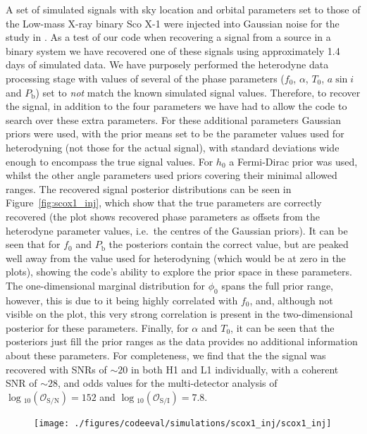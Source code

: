 A set of simulated signals with sky location and orbital parameters set to those of the Low-mass X-ray binary Sco X-1 were injected into
Gaussian noise for the study in \citet{2015PhRvD..92b3006M}. As a test of our code when recovering a signal from a source in a binary system
we have recovered one of these signals using approximately 1.4 days of simulated data. We have purposely performed the heterodyne data processing stage
with values of several of the phase parameters ($f_0$, $\alpha$, $T_0$, $a\sin{i}$ and $P_{\text{b}}$) set to {\it not} match the known simulated signal
values. Therefore, to recover the signal, in addition to the four \gw parameters we have had to allow the code to search over these extra parameters.
For these additional parameters Gaussian priors were used, with the prior means set to be the parameter values used for heterodyning (not those for
the actual signal), with standard deviations wide enough to encompass the true signal values. For $h_0$ a Fermi-Dirac prior was used, whilst the other
angle parameters used priors covering their minimal allowed ranges. The recovered signal posterior distributions can be seen
in Figure~\ref{fig:scox1_inj}, which show that the true parameters are correctly recovered (the plot shows recovered phase parameters as offsets from
the heterodyne parameter values, i.e.\ the centres of the Gaussian priors). It can be seen that for $f_0$ and $P_{\text{b}}$ the posteriors contain the
correct value, but are peaked well away from the value used for heterodyning (which would be at zero in the plots), showing the code's ability to explore
the prior space in these parameters. The one-dimensional marginal distribution for $\phi_0$ spans the full prior range, however, this is due to it being
highly correlated with $f_0$, and, although not visible on the plot, this very strong correlation is present in the two-dimensional posterior for these
parameters. Finally, for $\alpha$ and $T_0$, it can be seen that the posteriors just fill the prior ranges as the data provides no additional information
about these parameters. For completeness, we find that the the signal was recovered with SNRs of $\sim 20$ in both H1 and L1 individually, with a coherent
SNR of $\sim 28$, and odds values for the multi-detector analysis of $\log{}_{10}\left(\mathcal{O}_{\text{S}/\text{N}}\right) = 152$
and $\log{}_{10}\left(\mathcal{O}_{\text{S}/\text{I}}\right) = 7.8$.

\begin{figure}[!phtb]
\begin{center}
\texttt{[image: ./figures/codeeval/simulations/scox1\_inj/scox1\_inj]}
\caption{ \protect}
\end{center}
\end{figure}

